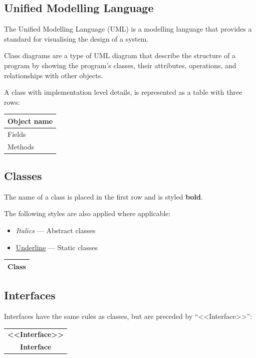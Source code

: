 \documentclass{article}
\begin{document}
\subsection{Unified Modelling Language}
The Unified Modelling Language (UML) is a modelling language that provides a standard for visualising the
design of a system.

Class diagrams are a type of UML diagram that describe the structure of a program by showing the program's classes,
their attributes, operations, and relationships with other objects.

A class with implementation level details, is represented as a table with three rows:
\begin{table}[H]
    \centering
    \begin{tabular}{|l|} %
        \hline %
        \textbf{Object name} \\
        \hline %
        Fields               \\
        \hline %
        Methods              \\
        \hline %
    \end{tabular}
\end{table}
\subsection{Classes}
The name of a class is placed in the first row and is styled \textbf{bold}.

The following styles are also applied where applicable:
\begin{itemize}
    \item \textit{Italics} --- Abstract classes
    \item \underline{Underline} --- Static classes
\end{itemize}
\begin{table}[H]
    \centering
    \begin{tabular}{|c|} %
        \hline %
        \textbf{Class} \\
        \hline %
    \end{tabular}
\end{table}
\subsection{Interfaces}
Interfaces have the same rules as classes, but are preceded by ``<<Interface>>'':
\begin{table}[H]
    \centering
    \begin{tabular}{|c|} %
        \hline %
        \textbf{<<Interface>>} \\
        \textbf{Interface}     \\
        \hline %
    \end{tabular}
\end{table}
\end{document}
